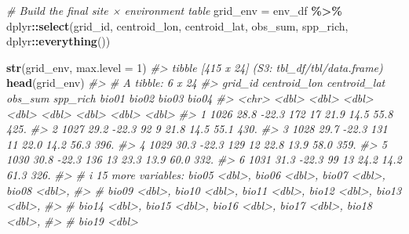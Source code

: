 \documentclass[
]{article}
\newenvironment{Shaded}{\begin{snugshade}}{\end{snugshade}}
\newcommand{\AttributeTok}[1]{\textcolor[rgb]{0.13,0.29,0.53}{#1}}
\newcommand{\CommentTok}[1]{\textcolor[rgb]{0.56,0.35,0.01}{\textit{#1}}}
\newcommand{\DecValTok}[1]{\textcolor[rgb]{0.00,0.00,0.81}{#1}}
\newcommand{\FunctionTok}[1]{\textcolor[rgb]{0.13,0.29,0.53}{\textbf{#1}}}
\newcommand{\NormalTok}[1]{#1}
\newcommand{\OtherTok}[1]{\textcolor[rgb]{0.56,0.35,0.01}{#1}}
\newcommand{\SpecialCharTok}[1]{\textcolor[rgb]{0.81,0.36,0.00}{\textbf{#1}}}
\begin{document}
\begin{Shaded}
\begin{Highlighting}[]
\CommentTok{\# Build the final site × environment table}
\NormalTok{grid\_env }\OtherTok{=}\NormalTok{ env\_df }\SpecialCharTok{\%\textgreater{}\%}
\NormalTok{  dplyr}\SpecialCharTok{::}\FunctionTok{select}\NormalTok{(grid\_id, centroid\_lon, centroid\_lat,}
\NormalTok{                obs\_sum, spp\_rich, dplyr}\SpecialCharTok{::}\FunctionTok{everything}\NormalTok{())}

\FunctionTok{str}\NormalTok{(grid\_env, }\AttributeTok{max.level =} \DecValTok{1}\NormalTok{)}
\CommentTok{\#\textgreater{} tibble [415 x 24] (S3: tbl\_df/tbl/data.frame)}
\FunctionTok{head}\NormalTok{(grid\_env)}
\CommentTok{\#\textgreater{} \# A tibble: 6 x 24}
\CommentTok{\#\textgreater{}   grid\_id centroid\_lon centroid\_lat obs\_sum spp\_rich bio01 bio02 bio03 bio04}
\CommentTok{\#\textgreater{}   \textless{}chr\textgreater{}          \textless{}dbl\textgreater{}        \textless{}dbl\textgreater{}   \textless{}dbl\textgreater{}    \textless{}dbl\textgreater{} \textless{}dbl\textgreater{} \textless{}dbl\textgreater{} \textless{}dbl\textgreater{} \textless{}dbl\textgreater{}}
\CommentTok{\#\textgreater{} 1 1026            28.8        {-}22.3     172       17  21.9  14.5  55.8  425.}
\CommentTok{\#\textgreater{} 2 1027            29.2        {-}22.3      92        9  21.8  14.5  55.1  430.}
\CommentTok{\#\textgreater{} 3 1028            29.7        {-}22.3     131       11  22.0  14.2  56.3  396.}
\CommentTok{\#\textgreater{} 4 1029            30.3        {-}22.3     129       12  22.8  13.9  58.0  359.}
\CommentTok{\#\textgreater{} 5 1030            30.8        {-}22.3     136       13  23.3  13.9  60.0  332.}
\CommentTok{\#\textgreater{} 6 1031            31.3        {-}22.3      99       13  24.2  14.2  61.3  326.}
\CommentTok{\#\textgreater{} \# i 15 more variables: bio05 \textless{}dbl\textgreater{}, bio06 \textless{}dbl\textgreater{}, bio07 \textless{}dbl\textgreater{}, bio08 \textless{}dbl\textgreater{},}
\CommentTok{\#\textgreater{} \#   bio09 \textless{}dbl\textgreater{}, bio10 \textless{}dbl\textgreater{}, bio11 \textless{}dbl\textgreater{}, bio12 \textless{}dbl\textgreater{}, bio13 \textless{}dbl\textgreater{},}
\CommentTok{\#\textgreater{} \#   bio14 \textless{}dbl\textgreater{}, bio15 \textless{}dbl\textgreater{}, bio16 \textless{}dbl\textgreater{}, bio17 \textless{}dbl\textgreater{}, bio18 \textless{}dbl\textgreater{},}
\CommentTok{\#\textgreater{} \#   bio19 \textless{}dbl\textgreater{}}
\end{Highlighting}
\end{Shaded}
\end{document}

